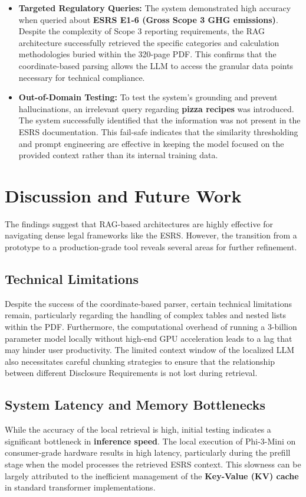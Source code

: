 \documentclass[12pt]{article}
\begin{document}
\begin{itemize}
    \item \textbf{Targeted Regulatory Queries:} The system demonstrated high accuracy when queried about \textbf{ESRS E1-6 (Gross Scope 3 GHG emissions)}. Despite the complexity of Scope 3 reporting requirements, the RAG architecture successfully retrieved the specific categories and calculation methodologies buried within the 320-page PDF. This confirms that the coordinate-based parsing allows the LLM to access the granular data points necessary for technical compliance.
    \item \textbf{Out-of-Domain Testing:} To test the system’s grounding and prevent hallucinations, an irrelevant query regarding \textbf{pizza recipes} was introduced. The system successfully identified that the information was not present in the ESRS documentation. This fail-safe indicates that the similarity thresholding and prompt engineering are effective in keeping the model focused on the provided context rather than its internal training data.
\end{itemize}


\section{Discussion and Future Work}
The findings suggest that RAG-based architectures are highly effective for navigating dense legal frameworks like the ESRS. However, the transition from a prototype to a production-grade tool reveals several areas for further refinement.

\subsection{Technical Limitations}
Despite the success of the coordinate-based parser, certain technical limitations remain, particularly regarding the handling of complex tables and nested lists within the PDF. Furthermore, the computational overhead of running a 3-billion parameter model locally without high-end GPU acceleration leads to a lag that may hinder user productivity. The limited context window of the localized LLM also necessitates careful chunking strategies to ensure that the relationship between different Disclosure Requirements is not lost during retrieval.

\subsection{System Latency and Memory Bottlenecks}
While the accuracy of the local retrieval is high, initial testing indicates a significant bottleneck in \textbf{inference speed}. The local execution of Phi-3-Mini on consumer-grade hardware results in high latency, particularly during the prefill stage when the model processes the retrieved ESRS context. This slowness can be largely attributed to the inefficient management of the \textbf{Key-Value (KV) cache} in standard transformer implementations.
\end{document}
